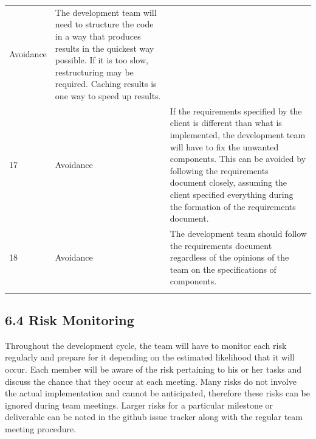 \documentclass[]{article}
\begin{document}
\begin{longtable}[c]{@{}lll@{}}
\begin{minipage}[t]{0.30\columnwidth}
Avoidance
\end{minipage} & \begin{minipage}[t]{0.30\columnwidth}\raggedright
The development team will need to structure the code in a way that
produces results in the quickest way possible. If it is too slow,
restructuring may be required. Caching results is one way to speed up
results.
\end{minipage}
\\\addlinespace
\begin{minipage}[t]{0.30\columnwidth}\raggedright
17
\end{minipage} & \begin{minipage}[t]{0.30\columnwidth}\raggedright
Avoidance
\end{minipage} & \begin{minipage}[t]{0.30\columnwidth}\raggedright
If the requirements specified by the client is different than what is
implemented, the development team will have to fix the unwanted
components. This can be avoided by following the requirements document
closely, assuming the client specified everything during the formation
of the requirements document.
\end{minipage}
\\\addlinespace
\begin{minipage}[t]{0.30\columnwidth}\raggedright
18
\end{minipage} & \begin{minipage}[t]{0.30\columnwidth}\raggedright
Avoidance
\end{minipage} & \begin{minipage}[t]{0.30\columnwidth}\raggedright
The development team should follow the requirements document regardless
of the opinions of the team on the specifications of components.
\end{minipage}
\\\addlinespace
\bottomrule
\end{longtable}

\subsection{6.4 Risk Monitoring}\label{risk-monitoring}

Throughout the development cycle, the team will have to monitor each
risk regularly and prepare for it depending on the estimated likelihood
that it will occur. Each member will be aware of the risk pertaining to
his or her tasks and discuss the chance that they occur at each meeting.
Many risks do not involve the actual implementation and cannot be
anticipated, therefore these risks can be ignored during team meetings.
Larger risks for a particular milestone or deliverable can be noted in
the github issue tracker along with the regular team meeting procedure.
\end{document}
